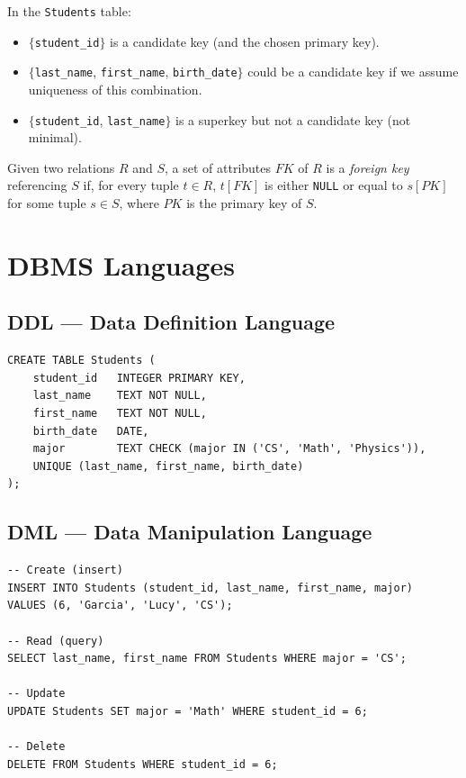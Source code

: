 \begin{example}
In the \texttt{Students} table:
\begin{itemize}
    \item $\{$\texttt{student\_id}$\}$ is a candidate key (and the chosen primary key).
    \item $\{$\texttt{last\_name}, \texttt{first\_name}, \texttt{birth\_date}$\}$ could
          be a candidate key if we assume uniqueness of this combination.
    \item $\{$\texttt{student\_id}, \texttt{last\_name}$\}$ is a superkey but not a
          candidate key (not minimal).
\end{itemize}
\end{example}

\begin{definition}
Given two relations $R$ and $S$, a set of attributes $FK$ of $R$ is a
\emph{foreign key} referencing $S$ if, for every tuple $t \in R$,
$t[FK]$ is either \texttt{NULL} or equal to $s[PK]$ for some tuple $s \in S$,
where $PK$ is the primary key of $S$.
\end{definition}

\section{DBMS Languages}

\subsection{DDL --- Data Definition Language}

\begin{codeblock}[title=\textbf{Creating a Table with Constraints}]
\begin{verbatim}
CREATE TABLE Students (
    student_id   INTEGER PRIMARY KEY,
    last_name    TEXT NOT NULL,
    first_name   TEXT NOT NULL,
    birth_date   DATE,
    major        TEXT CHECK (major IN ('CS', 'Math', 'Physics')),
    UNIQUE (last_name, first_name, birth_date)
);
\end{verbatim}
\end{codeblock}

\subsection{DML --- Data Manipulation Language}

\begin{codeblock}[title=\textbf{Basic CRUD Operations}]
\begin{verbatim}
-- Create (insert)
INSERT INTO Students (student_id, last_name, first_name, major)
VALUES (6, 'Garcia', 'Lucy', 'CS');

-- Read (query)
SELECT last_name, first_name FROM Students WHERE major = 'CS';

-- Update
UPDATE Students SET major = 'Math' WHERE student_id = 6;

-- Delete
DELETE FROM Students WHERE student_id = 6;
\end{verbatim}
\end{codeblock}

